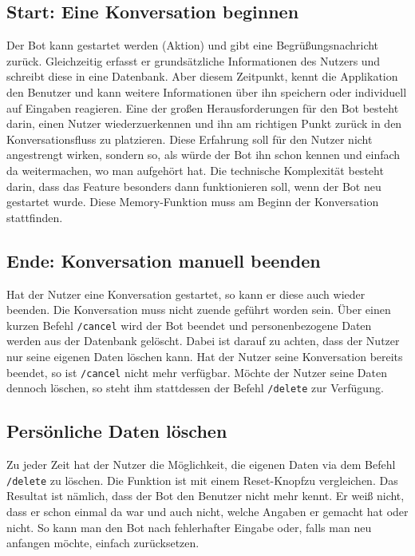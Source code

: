         \subsection{Start: Eine Konversation beginnen}
            Der Bot kann gestartet werden (Aktion) und gibt eine Begrüßungsnachricht zurück. Gleichzeitig erfasst er grundsätzliche Informationen des Nutzers und schreibt diese in eine Datenbank. Aber diesem Zeitpunkt, kennt die Applikation den Benutzer und kann weitere Informationen über ihn speichern oder individuell auf Eingaben reagieren.
            Eine der großen Herausforderungen für den Bot besteht darin, einen Nutzer wiederzuerkennen und ihn am richtigen Punkt zurück in den Konversationsfluss zu platzieren. Diese Erfahrung soll für den Nutzer nicht angestrengt wirken, sondern so, als würde der Bot ihn schon kennen und einfach da weitermachen, wo man aufgehört hat. Die technische Komplexität besteht darin, dass das Feature besonders dann funktionieren soll, wenn der Bot neu gestartet wurde. Diese Memory-Funktion muss am Beginn der Konversation stattfinden.

        \subsection{Ende: Konversation manuell beenden}
            Hat der Nutzer eine Konversation gestartet, so kann er diese auch wieder beenden. Die Konversation muss nicht zuende geführt worden sein. Über einen kurzen Befehl \verb|/cancel| wird der Bot beendet und personenbezogene Daten werden aus der Datenbank gelöscht. Dabei ist darauf zu achten, dass der Nutzer nur seine eigenen Daten löschen kann. Hat der Nutzer seine Konversation bereits beendet, so ist \verb|/cancel| nicht mehr verfügbar. Möchte der Nutzer seine Daten dennoch löschen, so steht ihm stattdessen der Befehl \verb|/delete| zur Verfügung.

        \subsection{Persönliche Daten löschen}
            Zu jeder Zeit hat der Nutzer die Möglichkeit, die eigenen Daten via dem Befehl \verb|/delete| zu löschen. Die Funktion ist mit einem \glqq Reset-Knopf\grqq  zu vergleichen. Das Resultat ist nämlich, dass der Bot den Benutzer nicht mehr kennt. Er weiß nicht, dass er schon einmal da war und auch nicht, welche Angaben er gemacht hat oder nicht. So kann man den Bot nach fehlerhafter Eingabe oder, falls man neu anfangen möchte, einfach zurücksetzen.

